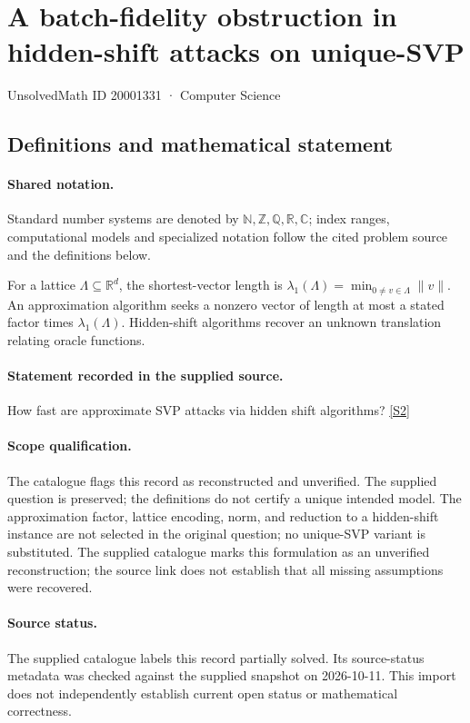 \documentclass[11pt]{article}
\newcommand{\sref}[2]{\hyperlink{source:#1:#2}{[S#2]}}
\begin{document}
\setcounter{section}{20001330}
\section{A batch-fidelity obstruction in hidden-shift attacks on unique-SVP}\label{20001331}
{\small\sffamily UnsolvedMath ID 20001331 · Computer Science}
\subsection{Definitions and mathematical statement}

\paragraph{Shared notation.}Standard number systems are denoted by $\mathbb N,\mathbb Z,\mathbb Q,\mathbb R,\mathbb C$; index ranges, computational models and specialized notation follow the cited problem source and the definitions below.


For a lattice $\Lambda\subseteq\mathbb R^d$, the shortest-vector length is $\lambda_1(\Lambda)=\min_{0\ne v\in\Lambda}\|v\|$. An approximation algorithm seeks a nonzero vector of length at most a stated factor times $\lambda_1(\Lambda)$. Hidden-shift algorithms recover an unknown translation relating oracle functions.
\paragraph{Statement recorded in the supplied source.}
How fast are approximate SVP attacks via hidden shift algorithms? \sref{20001331}{2}
\paragraph{Scope qualification.}
The catalogue flags this record as reconstructed and unverified. The supplied question is preserved; the definitions do not certify a unique intended model. The approximation factor, lattice encoding, norm, and reduction to a hidden-shift instance are not selected in the original question; no unique-SVP variant is substituted.
The supplied catalogue marks this formulation as an unverified reconstruction; the source link does not establish that all missing assumptions were recovered.
\paragraph{Source status.}
The supplied catalogue labels this record partially solved. Its source-status metadata was checked against the supplied snapshot on 2026-10-11. This import does not independently establish current open status or mathematical correctness.
\end{document}
